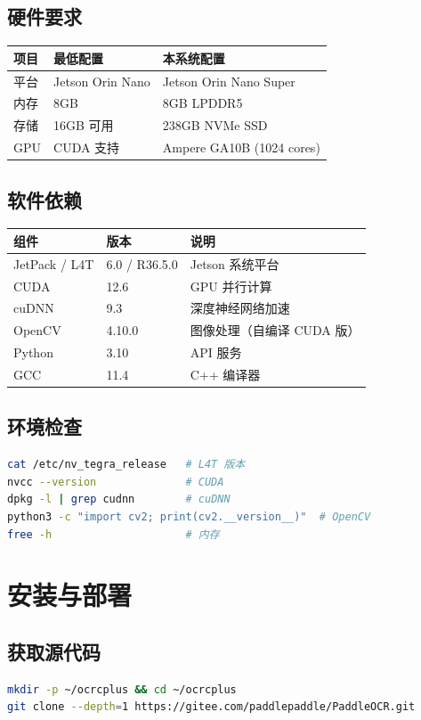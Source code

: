 \documentclass[12pt,a4paper]{ctexart}
\begin{document}
\subsection{硬件要求}
\begin{longtable}{|p{4cm}|p{4cm}|p{5cm}|}\hline
\textbf{项目} & \textbf{最低配置} & \textbf{本系统配置} \\\hline
平台 & Jetson Orin Nano & Jetson Orin Nano Super \\\hline
内存 & 8GB & 8GB LPDDR5 \\\hline
存储 & 16GB 可用 & 238GB NVMe SSD \\\hline
GPU & CUDA 支持 & Ampere GA10B (1024 cores) \\\hline
\end{longtable}

\subsection{软件依赖}
\begin{longtable}{|p{4cm}|p{3cm}|p{6cm}|}\hline
\textbf{组件} & \textbf{版本} & \textbf{说明} \\\hline
JetPack / L4T & 6.0 / R36.5.0 & Jetson 系统平台 \\\hline
CUDA & 12.6 & GPU 并行计算 \\\hline
cuDNN & 9.3 & 深度神经网络加速 \\\hline
OpenCV & 4.10.0 & 图像处理（自编译 CUDA 版） \\\hline
Python & 3.10 & API 服务 \\\hline
GCC & 11.4 & C++ 编译器 \\\hline
\end{longtable}

\subsection{环境检查}
\begin{lstlisting}[language=bash]
cat /etc/nv_tegra_release   # L4T 版本
nvcc --version              # CUDA
dpkg -l | grep cudnn        # cuDNN
python3 -c "import cv2; print(cv2.__version__)"  # OpenCV
free -h                     # 内存
\end{lstlisting}

\section{安装与部署}

\subsection{获取源代码}
\begin{lstlisting}[language=bash]
mkdir -p ~/ocrcplus && cd ~/ocrcplus
git clone --depth=1 https://gitee.com/paddlepaddle/PaddleOCR.git
\end{lstlisting}
\end{document}
